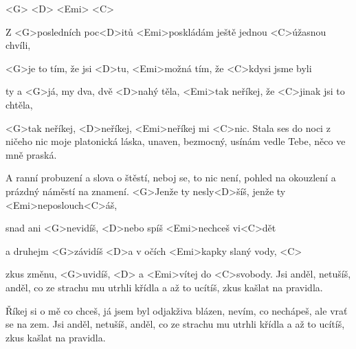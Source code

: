 
<G> <D> <Emi> <C>

\zs
Z <G>posledních poc<D>itů
<Emi>poskládám ještě jednou <C>úžasnou chvíli,

<G>je to tím, že jsi <D>tu,
<Emi>možná tím, že <C>kdysi jsme byli

ty a <G>já, my dva, dvě <D>nahý těla,
<Emi>tak neříkej, že <C>jinak jsi to chtěla,

<G>tak neříkej,
<D>neříkej, <Emi>neříkej mi <C>nic.
\ks
\zs
Stala ses do noci
z ničeho nic moje platonická láska,
unaven, bezmocný,
usínám vedle Tebe, něco ve mně praská.

A ranní probuzení
a slova o štěstí, neboj se, to nic není,
pohled na okouzlení
a prázdný náměstí na znamení.
\ks
\zr
<G>Jenže ty nesly<D>šíš,
jenže ty <Emi>neposlouch<C>áš,

snad ani <G>nevidíš,
<D>nebo spíš <Emi>nechceš vi<C>dět

a druhejm <G>závidíš
<D>a v očích <Emi>kapky slaný vody, <C>

zkus změnu, <G>uvidíš, <D>
a <Emi>vítej do <C>svobody.
\kr
\zs
Jsi anděl, netušíš,
anděl, co ze strachu mu utrhli křídla
a až to ucítíš, zkus kašlat na pravidla.

Říkej si o mě co chceš,
já jsem byl odjakživa blázen,
nevím, co nechápeš,
ale vrať se na zem.
\ks
\zr \kr
\zs
Jsi anděl, netušíš,
anděl, co ze strachu mu utrhli křídla
a až to ucítíš, zkus kašlat na pravidla.
\ks
\zr \kr

\kp






